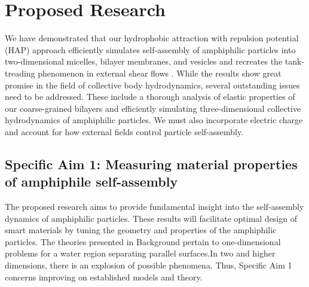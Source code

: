 \section{Proposed Research}
\label{sec:proposed-work}
We have demonstrated that our hydrophobic attraction with repulsion
potential (HAP) approach efficiently simulates self-assembly of
amphiphilic particles into two-dimensional micelles, bilayer membranes,
and vesicles \cite{Fu2018_SIAM} and recreates the tank-treading
phenomenon in external shear flows \cite{FuQuRyYo20}.
While the results show great promise in the field of collective body
hydrodynamics, several outstanding issues need to be addressed. These
include a thorough analysis of elastic properties of our coarse-grained
bilayers and efficiently simulating three-dimensional collective
hydrodynamics of amphiphilic particles.
We must also incorporate electric charge and account
for how external fields control particle self-assembly. 

\subsection{Specific Aim 1: Measuring material properties of amphiphile
  self-assembly}
\label{subsec:specific_aim_1}

The proposed research aims to provide fundamental insight into the
self-assembly dynamics of amphiphilic particles. These results will
facilitate optimal design of smart materials by tuning the geometry and
properties of the amphiphilic particles.
The theories presented in Background pertain to one-dimensional problems
for a water region separating parallel surfaces.In two and higher
dimensions, there is an explosion of possible phenomena. Thus, Specific
Aim 1 concerns improving on established models and theory.

